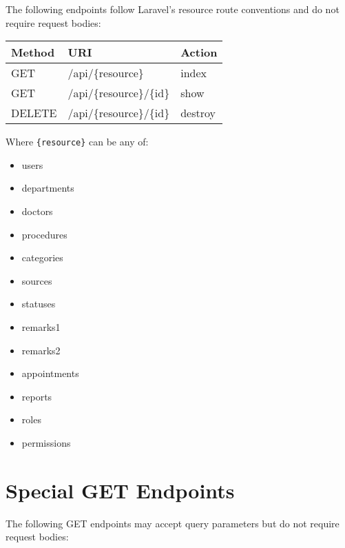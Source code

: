 \documentclass[12pt,a4paper]{article}
\begin{document}
The following endpoints follow Laravel's resource route conventions and do not require request bodies:

\begin{longtable}{|l|l|l|}
\hline
\textbf{Method} & \textbf{URI} & \textbf{Action} \\
\hline
GET & /api/\{resource\} & index \\
\hline
GET & /api/\{resource\}/\{id\} & show \\
\hline
DELETE & /api/\{resource\}/\{id\} & destroy \\
\hline
\end{longtable}

\noindent Where \texttt{\{resource\}} can be any of:
\begin{itemize}
    \item users
    \item departments
    \item doctors
    \item procedures
    \item categories
    \item sources
    \item statuses
    \item remarks1
    \item remarks2
    \item appointments
    \item reports
    \item roles
    \item permissions
\end{itemize}

\section{Special GET Endpoints}

The following GET endpoints may accept query parameters but do not require request bodies:
\end{document}
